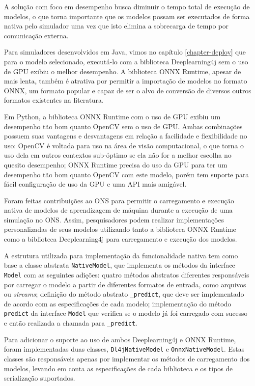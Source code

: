 A solução com foco em desempenho busca diminuir o tempo total de execução de modelos, o que torna importante que os modelos possam ser executados de forma nativa pelo simulador uma vez que isto elimina a sobrecarga de tempo por comunicação externa.

Para simuladores desenvolvidos em Java, vimos no capítulo \ref{chapter-deploy} que para o modelo selecionado, executá-lo com a biblioteca Deeplearning4j sem o uso de GPU exibiu o melhor desempenho. A biblioteca ONNX Runtime, apesar de mais lenta, também é atrativa por permitir a importação de modelos no formato ONNX, um formato popular e capaz de ser o alvo de conversão de diversos outros formatos existentes na literatura.

Em Python, a biblioteca ONNX Runtime com o uso de GPU exibiu um desempenho tão bom quanto OpenCV sem o uso de GPU. Ambas combinações possuem suas vantagens e desvantagens em relação a facilidade e flexibilidade no uso: OpenCV é voltada para uso na área de visão computacional, o que torna o uso dela em outros contextos sub-óptimo se ela não for a melhor escolha no quesito desempenho; ONNX Runtime precisa do uso da GPU para ter um desempenho tão bom quanto OpenCV com este modelo, porém tem suporte para fácil configuração de uso da GPU e uma API mais amigável.

Foram feitas contribuições ao ONS para permitir o carregamento e execução nativa de modelos de aprendizagem de máquina durante a execução de uma simulação no ONS. Assim, pesquisadores podem realizar implementações personalizadas de seus modelos utilizando tanto a biblioteca ONNX Runtime como a biblioteca Deeplearning4j para carregamento e execução dos modelos.

A estrutura utilizada para implementação da funcionalidade nativa tem como base a classe abstrata \texttt{NativeModel}, que implementa os métodos da interface \texttt{Model} com as seguintes adições: quatro métodos abstratos diferentes responsáveis por carregar o modelo a partir de diferentes formatos de entrada, como arquivos ou \textit{streams}; definição do método abstrato \texttt{\_predict}, que deve ser implementado de acordo com as especificações de cada modelo; implementação do método \texttt{predict} da interface \texttt{Model} que verifica se o modelo já foi carregado com sucesso e então realizada a chamada para \texttt{\_predict}.

Para adicionar o suporte ao uso de ambos Deeplearning4j e ONNX Runtime, foram implementadas duas classes, \texttt{Dl4jNativeModel} e \texttt{OnnxNativeModel}. Estas classes são responsáveis apenas por implementar os métodos de carregamento dos modelos, levando em conta as especificações de cada biblioteca e os tipos de serialização suportados.


